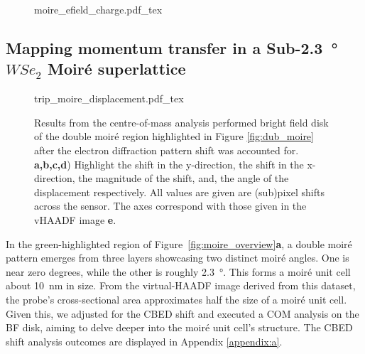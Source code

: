\begin{figure}
    \centering
    \def\svgwidth{.5\linewidth}
    {moire_efield_charge.pdf_tex}
    \caption{}
    \label{fig:m_mom}
\end{figure}

\subsection{Mapping momentum transfer in a Sub-\SI{2.3}{\degree} $WSe_2$ Moiré superlattice}
\label{sec:large_moire}
\begin{figure}
    \centering
    \def\svgwidth{.95\linewidth}
    {trip_moire_displacement.pdf_tex}
    \caption{Results from the centre-of-mass analysis performed bright field disk of the double moiré region highlighted in Figure \ref{fig:dub_moire} after the electron diffraction pattern shift was accounted for. \textbf{a,b,c,d}) Highlight the shift in the y-direction, the shift in the x-direction, the magnitude of the shift, and, the angle of the displacement respectively. All values are given are (sub)pixel shifts across the sensor. The axes correspond with those given in the vHAADF image \textbf{e}.}
    \label{fig:trip_m_dis}
\end{figure}

In the green-highlighted region of Figure~\ref{fig:moire_overview}\textbf{a}, a double moiré pattern emerges from three layers showcasing two distinct moiré angles.
%
One is near zero degrees, while the other is roughly \SI{2.3}{\degree}.
%
This forms a moiré unit cell about \SI{10}{\nano\meter} in size. 
%
From the virtual-HAADF image derived from this dataset, the probe's cross-sectional area approximates half the size of a moiré unit cell. 
%
Given this, we adjusted for the CBED shift and executed a COM analysis on the BF disk, aiming to delve deeper into the moiré unit cell's structure. 
%
The CBED shift analysis outcomes are displayed in Appendix \ref{appendix:a}.

